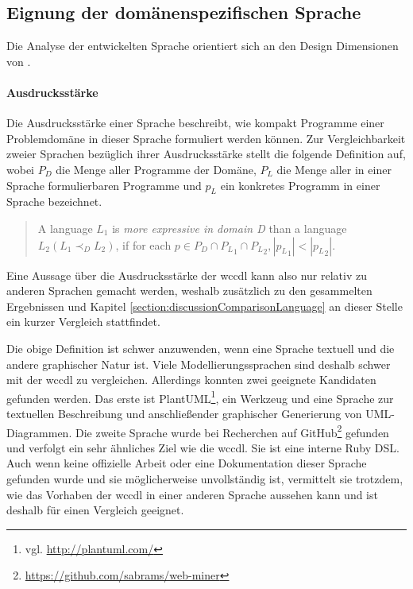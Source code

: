 \subsection{Eignung der domänenspezifischen Sprache}
    \label{section:discussionInterpretationLanguage}
    Die Analyse der entwickelten Sprache orientiert sich
    an den Design Dimensionen von \cite{voelter:DslEngineering}.

    \paragraph{Ausdrucksstärke}
    Die Ausdrucksstärke einer Sprache beschreibt,
    wie kompakt Programme einer Problemdomäne in dieser Sprache
    formuliert werden können.
    Zur Vergleichbarkeit zweier Sprachen bezüglich ihrer Ausdrucksstärke
    stellt \citet[Kapitel 4.1]{voelter:DslEngineering} die folgende
    Definition auf, wobei
    $P_D$ die Menge aller Programme der Domäne,
    $P_L$ die Menge aller in einer Sprache formulierbaren Programme und
    $p_L$ ein konkretes Programm in einer Sprache bezeichnet.

    \begin{quote}
        A language $L_1$ is \textit{more expressive in domain D}
        than a language $L_2 (L_1 {\prec}_D L_2)$,
        if for each $p \in P_D \cap {P_L}_1 \cap {P_L}_2, |{p_L}_1| < |{p_L}_2|$.
    \end{quote}

    Eine Aussage über die Ausdrucksstärke der \gls{wccdl} kann also
    nur relativ zu anderen Sprachen gemacht werden,
    weshalb zusätzlich zu den gesammelten Ergebnissen und
    Kapitel \ref{section:discussionComparisonLanguage}
    an dieser Stelle ein kurzer Vergleich stattfindet.

    Die obige Definition ist schwer anzuwenden,
    wenn eine Sprache textuell und die andere graphischer Natur ist.
    Viele Modellierungssprachen sind deshalb schwer mit der \gls{wccdl} zu vergleichen.
    Allerdings konnten zwei geeignete Kandidaten gefunden werden.
    Das erste ist PlantUML\footnote{vgl. \url{http://plantuml.com/}},
    ein Werkzeug und eine Sprache zur textuellen Beschreibung und anschließender
    graphischer Generierung von UML-Diagrammen.
    Die zweite Sprache wurde bei Recherchen auf
    GitHub\footnote{\url{https://github.com/sabrams/web-miner}} gefunden
    und verfolgt ein sehr ähnliches Ziel wie die \gls{wccdl}.
    Sie ist eine interne Ruby DSL.
    Auch wenn keine offizielle Arbeit oder eine Dokumentation dieser Sprache
    gefunden wurde und sie möglicherweise unvollständig ist,
    vermittelt sie trotzdem, wie das Vorhaben der \gls{wccdl}
    in einer anderen Sprache aussehen kann und ist deshalb für einen
    Vergleich geeignet.


